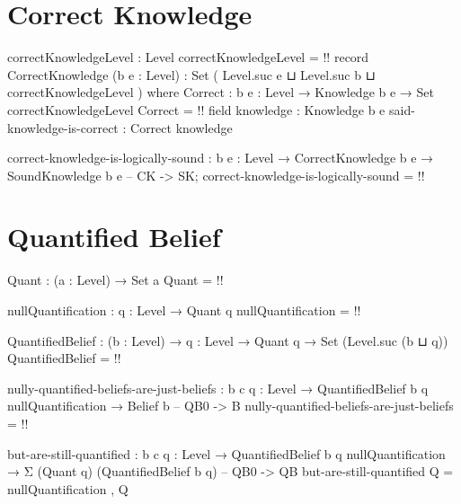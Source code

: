 \documentclass{article}
\begin{document}
\section{Correct Knowledge}

\begin{code}
correctKnowledgeLevel : Level
correctKnowledgeLevel = {!!}
record CorrectKnowledge (b e : Level) :
                        Set ( Level.suc e
                            ⊔ Level.suc b
                            ⊔ correctKnowledgeLevel
                            ) where
  Correct : {b e : Level} → Knowledge b e → Set correctKnowledgeLevel
  Correct = {!!}
  field
    knowledge : Knowledge b e
    said-knowledge-is-correct : Correct knowledge
\end{code}

\begin{code}
correct-knowledge-is-logically-sound :
  {b e : Level} → CorrectKnowledge b e → SoundKnowledge b e -- CK -> SK;
correct-knowledge-is-logically-sound = {!!}
\end{code}

\section{Quantified Belief}

\begin{code}
Quant : (a : Level) → Set a
Quant = {!!}
\end{code}

\begin{code}
nullQuantification : {q : Level} → Quant q
nullQuantification = {!!}
\end{code}

\begin{code}
QuantifiedBelief : (b : Level) → {q : Level} → Quant q → Set (Level.suc (b ⊔ q))
QuantifiedBelief = {!!}
\end{code}

\begin{code}
nully-quantified-beliefs-are-just-beliefs :
  {b c q : Level} → QuantifiedBelief b {q} nullQuantification → Belief b -- QB0 -> B
nully-quantified-beliefs-are-just-beliefs = {!!}
\end{code}

\begin{code}
but-are-still-quantified :
  {b c q : Level} →
  QuantifiedBelief b {q} nullQuantification →
  Σ (Quant q) (QuantifiedBelief b {q}) -- QB0 -> QB
but-are-still-quantified Q = nullQuantification , Q
\end{code}
\end{document}
